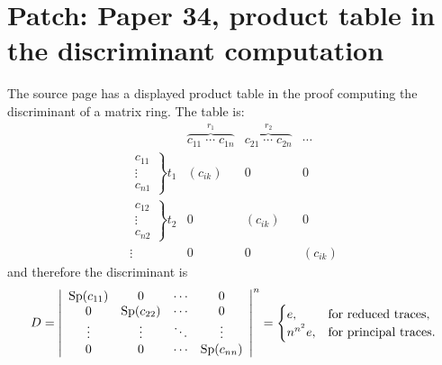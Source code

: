 \documentclass[11pt]{article}
\begin{document}
\section*{Patch: Paper 34, product table in the discriminant computation}

The source page has a displayed product table in the proof computing the discriminant of a matrix ring. The table is:
\[
\begin{array}{c|ccc}
& \overbrace{c_{11}\;\cdots\;c_{1n}}^{r_1}
& \overbrace{c_{21}\;\cdots\;c_{2n}}^{r_2}
& \cdots \\ \hline
\left.\begin{array}{c}c_{11}\\[-1mm]\vdots\\[-1mm]c_{n1}\end{array}\right\}t_1
& (c_{ik}) & 0 & 0 \\[1.3em]
\left.\begin{array}{c}c_{12}\\[-1mm]\vdots\\[-1mm]c_{n2}\end{array}\right\}t_2
& 0 & (c_{ik}) & 0 \\[1.3em]
\vdots & 0 & 0 & (c_{ik})
\end{array}
\]
and therefore the discriminant is
\[
        D=\left|\begin{array}{cccc}
        \operatorname{Sp}(c_{11})&0&\cdots&0\\
        0&\operatorname{Sp}(c_{22})&\cdots&0\\
        \vdots&\vdots&\ddots&\vdots\\
        0&0&\cdots&\operatorname{Sp}(c_{nn})
        \end{array}\right|^{n}
        =\begin{cases}
        e, & \hbox{for reduced traces},\\
        n^{n^2}e, & \hbox{for principal traces}.
        \end{cases}
\]
\end{document}
